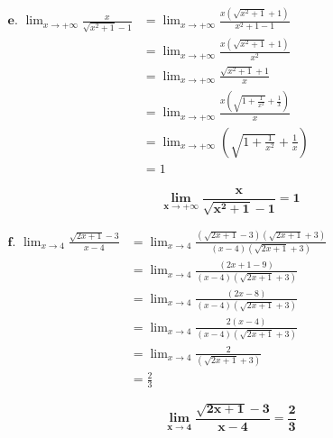 \documentclass[12pt,a4paper]{article}
\begin{document}
\(
\begin{aligned}
\textbf{e. }\lim_{x \to +\infty} \frac{x}{\sqrt{x^2 +1}-1} &= \lim_{x \to +\infty} \frac{x(\sqrt{x^2 +1}+1)}{x^2 +1-1}\\
																													 &= \lim_{x \to +\infty} \frac{x(\sqrt{x^2 +1}+1)}{x^2}\\
																													 &= \lim_{x \to +\infty} \frac{\sqrt{x^2 +1}+1}{x}\\
																													 &= \lim_{x \to +\infty} \frac{x\left(\sqrt{1 + \frac{1}{x^{2}}}+\frac{1}{x}\right)}{x}\\																													 
																													 &= \lim_{x \to +\infty}\left(\sqrt{1 + \frac{1}{x^{2}}}+\frac{1}{x}\right)\\
																													 &= 1
\end{aligned}
\)

									  \begin{resultbox}
                        \[
                            \mathbf{ \lim_{x \to +\infty} \frac{x}{\sqrt{x^2 +1}-1} = 1 }
                        \]
                    \end{resultbox}	
                    
\(
\begin{aligned}
\textbf{f. }\lim_{x \to 4} \frac{\sqrt{2x + 1} - 3}{x - 4} &= \lim_{x \to 4} \frac{\left(\sqrt{2x + 1} - 3\right)\left(\sqrt{2x + 1} + 3\right)}{(x - 4)\left(\sqrt{2x + 1} + 3\right)}\\
																													 &= \lim_{x \to 4} \frac{\left(2x + 1 - 9\right)}{(x - 4)\left(\sqrt{2x + 1} + 3\right)}\\
																													 &= \lim_{x \to 4} \frac{\left(2x - 8\right)}{(x - 4)\left(\sqrt{2x + 1} + 3\right)}\\
																													 &= \lim_{x \to 4} \frac{2\left(x - 4\right)}{(x - 4)\left(\sqrt{2x + 1} + 3\right)}\\
																													 &= \lim_{x \to 4} \frac{2}{\left(\sqrt{2x + 1} + 3\right)}\\
																													 &=\frac{2}{3}
\end{aligned}
\)

									  \begin{resultbox}
                        \[
                            \mathbf{ \lim_{x \to 4} \frac{\sqrt{2x + 1} - 3}{x - 4} = \frac{2}{3}}
                        \]
                    \end{resultbox}	
                    
\end{document}
